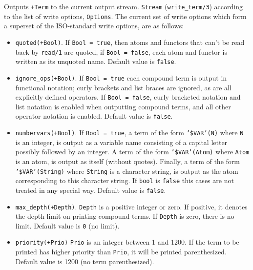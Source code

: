 \begin{description}
%
Outputs {\tt +Term} to the current output stream.
{\tt Stream} ({\tt write\_term/3}) according to the list of write
options, {\tt Options}.  The current set of write options which form a
superset of the ISO-standard write options, are as follows:
%
\begin{itemize}
%
\item {\tt quoted(+Bool)}.  If {\tt Bool = true}, then atoms and
    functors that can't be read back by {\tt read/1} are quoted, if
    {\tt Bool = false}, each atom and functor is written as its
    unquoted name. Default value is {\tt false}.
%
\item {\tt ignore\_ops(+Bool)}. If {\tt Bool = true} each compound term
is output in functional notation; curly brackets and list braces are
ignored, as are all explicitly defined operators.  If {\tt Bool =
false}, curly bracketed notation and list notation is enabled when
outputting compound terms, and all other operator notation is
enabled.  Default value is {\tt false}.
%
 \item {\tt numbervars(+Bool)}.  If {\tt Bool = true}, a term of the
form {\tt '\$VAR'(N)} where {\tt N} is an integer, is output as a
variable name consisting of a capital letter possibly followed by an
integer.  A term of the form {\tt '\$VAR'(Atom)} where {\tt Atom} is an
atom, is output as itself (without quotes).  Finally, a term of the
form {\tt '\$VAR'(String)} where {\tt String} is a character string, is
output as the atom corresponding to this character string.  If
{\tt bool} is {\tt false} this cases are not treated in any special
way.  Default value is {\tt false}.
%
%
\item {\tt max\_depth(+Depth)}. {\tt Depth} is a positive integer or
zero. If positive, it denotes the depth limit on printing compound
terms. If {\tt Depth} is zero, there is no limit. Default value is
{\tt 0} (no limit).
%
\item {\tt priority(+Prio)} {\tt Prio} is an integer between 1 and
1200.  If the term to be printed has higher priority than {\tt Prio},
it will be printed parenthesized.  Default value is 1200 (no term
parenthesized).
\end{itemize}


\end{description}
